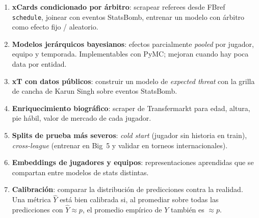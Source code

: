 \begin{enumerate}[label=\textbf{F\arabic*.}]
  \item \textbf{xCards condicionado por árbitro}: scrapear referees desde FBref \texttt{schedule}, joinear con eventos StatsBomb, entrenar un modelo con árbitro como efecto fijo / aleatorio.
  \item \textbf{Modelos jerárquicos bayesianos}: efectos parcialmente \emph{pooled} por jugador, equipo y temporada. Implementables con PyMC; mejoran cuando hay poca data por entidad.
  \item \textbf{xT con datos públicos}: construir un modelo de \emph{expected threat} con la grilla de cancha de Karun Singh sobre eventos StatsBomb.
  \item \textbf{Enriquecimiento biográfico}: scraper de Transfermarkt para edad, altura, pie hábil, valor de mercado de cada jugador.
  \item \textbf{Splits de prueba más severos}: \emph{cold start} (jugador sin historia en train), \emph{cross-league} (entrenar en Big~5 y validar en torneos internacionales).
  \item \textbf{Embeddings de jugadores y equipos}: representaciones aprendidas que se compartan entre modelos de stats distintas.
  \item \textbf{Calibración}: comparar la distribución de predicciones contra la realidad. Una métrica $\hat{Y}$ está bien calibrada si, al promediar sobre todas las predicciones con $\hat{Y} \approx p$, el promedio empírico de $Y$ también es $\approx p$.
\end{enumerate}
